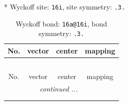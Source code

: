 \documentclass[fleqn,8pt]{jsarticle}
\begin{document}
* Wyckoff site: {\tt 16i}, site symmetry: {\tt .3.}
\renewcommand{\arraystretch}{1.2}
\begin{longtable}{cccc}
\caption{Wyckoff bond: {\tt 16a@16i}, bond symmetry: {\tt .3.}}
 \\
 \hline \hline
No. & vector & center & mapping \\ \hline \endfirsthead

\multicolumn{3}{l}{\tablename\ \thetable{}} \\
 \hline \hline
No. & vector & center & mapping \\ \hline \endhead

 \hline \hline
\multicolumn{3}{r}{\footnotesize\it continued ...} \\ \endfoot

 \hline \hline
\multicolumn{3}{r}{} \\ \endlastfoot


\end{longtable}
\end{document}
